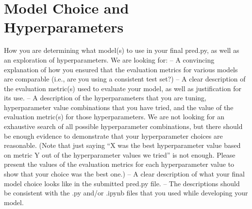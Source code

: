 \section{Model Choice and Hyperparameters}
How you are determining what model(s) to use in your final pred.py, as well as an exploration of hyperparameters. We are looking for:
– A convincing explanation of how you ensured that the evaluation metrics for various models are comparable (i.e., are you using a consistent test set?)
– A clear description of the evaluation metric(s) used to evaluate your model, as well as justification for its use.
– A description of the hyperparameters that you are tuning, hyperparameter value combinations that you have tried, and the value of the evaluation metric(s) for those hyperparameters. We are not looking for an exhaustive search of all possible hyperparameter combinations, but there should be enough evidence to demonstrate that your hyperparameter choices are reasonable. (Note that just saying “X was the best hyperparameter value based on metric Y out of the hyperparameter values we tried” is not enough. Please present the values of the evaluation metrics for each hyperparameter value to show that your choice was the best one.)
– A clear description of what your final model choice looks like in the submitted pred.py file.
– The descriptions should be consistent with the .py and/or .ipynb files that you used while developing your model.